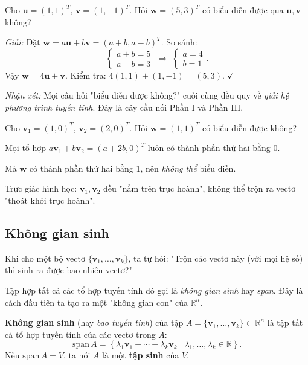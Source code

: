 \documentclass[12pt,a4paper]{article}
\begin{document}
\begin{vidu}[title={Biểu diễn qua vectơ chéo}]
Cho $\mathbf{u} = (1,1)^T$, $\mathbf{v} = (1,-1)^T$. Hỏi $\mathbf{w} = (5, 3)^T$ có biểu diễn được qua $\mathbf{u}, \mathbf{v}$ không?

\emph{Giải:} Đặt $\mathbf{w} = a\mathbf{u} + b\mathbf{v} = (a+b, a-b)^T$. So sánh:
\[
  \begin{cases} a + b = 5 \\ a - b = 3 \end{cases} \;\Longrightarrow\; \begin{cases} a = 4 \\ b = 1 \end{cases}.
\]
Vậy $\mathbf{w} = 4\mathbf{u} + \mathbf{v}$. Kiểm tra: $4(1,1) + (1,-1) = (5,3)$. $\checkmark$

\emph{Nhận xét:} Mọi câu hỏi "biểu diễn được không?" cuối cùng đều quy về \emph{giải hệ phương trình tuyến tính}. Đây là cây cầu nối Phần I và Phần III.
\end{vidu}

\begin{phanvidu}[title={Khi nào KHÔNG biểu diễn được?}]
Cho $\mathbf{v}_1 = (1,0)^T$, $\mathbf{v}_2 = (2,0)^T$. Hỏi $\mathbf{w} = (1, 1)^T$ có biểu diễn được không?

Mọi tổ hợp $a\mathbf{v}_1 + b\mathbf{v}_2 = (a+2b, 0)^T$ luôn có thành phần thứ hai bằng 0.

Mà $\mathbf{w}$ có thành phần thứ hai bằng 1, nên \emph{không thể} biểu diễn.

Trực giác hình học: $\mathbf{v}_1, \mathbf{v}_2$ đều "nằm trên trục hoành", không thể trộn ra vectơ "thoát khỏi trục hoành".
\end{phanvidu}

\subsection{Không gian sinh}

\begin{dongco}
Khi cho một bộ vectơ $\{\mathbf{v}_1, \ldots, \mathbf{v}_k\}$, ta tự hỏi: "Trộn các vectơ này (với mọi hệ số) thì sinh ra được bao nhiêu vectơ?"

Tập hợp tất cả các tổ hợp tuyến tính đó gọi là \emph{không gian sinh} hay \emph{span}. Đây là cách đầu tiên ta tạo ra một "không gian con" của $\mathbb{R}^n$.
\end{dongco}

\begin{dinhnghia}
  \textbf{Không gian sinh} (hay \emph{bao tuyến tính}) của tập $A = \{\mathbf{v}_1, \ldots, \mathbf{v}_k\} \subset \mathbb{R}^n$ là tập tất cả tổ hợp tuyến tính của các vectơ trong $A$:
  \[
    \mathrm{span}\,A = \left\{ \lambda_1 \mathbf{v}_1 + \cdots + \lambda_k \mathbf{v}_k \;\big|\; \lambda_1, \ldots, \lambda_k \in \mathbb{R} \right\}.
  \]
  Nếu $\mathrm{span}\,A = V$, ta nói $A$ là một \textbf{tập sinh} của $V$.
\end{dinhnghia}
\end{document}
